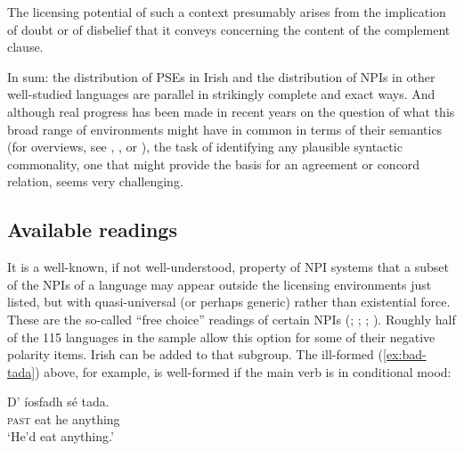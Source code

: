 \documentclass[output=paper,colorlinks,citecolor=brown]{langscibook}
\begin{document}

The licensing potential of such a context presumably arises from the implication of doubt or of disbelief that it conveys concerning the content of the complement clause.

In sum: the distribution of PSEs in Irish and the distribution of NPIs in other well-studied languages are parallel in strikingly complete and exact ways.  And although real progress has been made in recent years on the question of what this broad range of environments might have in common in terms of their semantics (for overviews, see \cite{giannakidou:11}, \cite{chierchia:13}, or \cite{homer:20}), the task of identifying any plausible syntactic commonality, one that might provide the basis for an agreement or concord relation, seems very challenging.

\subsection{Available readings}
\label{sec:free}

It is a well-known, if not well-understood, property of NPI systems that a subset of the NPIs of a language may appear outside the licensing environments just listed, but with quasi-universal (or perhaps generic) rather than existential force. These are the so-called “free choice” readings of certain NPIs (\cite{bolinger:72}; \cite[400 ff]{horn:89}; \cite{horn:00}; \cite[Chap. 6]{chierchia:13}). Roughly half of the 115 languages in the \citet{haspelmath:97} sample allow this option for some of their negative polarity items. Irish can be added to that subgroup. The ill-formed (\ref{ex:bad-tada}) above, for example, is well-formed if the main verb is in conditional mood:

\ea\label{ex:conditional}
\gll D' íosfadh sé tada. \\
     {\textsc{past}} {eat\cond} he anything \\
\glt `He'd eat anything.'
\z

\end{document}
